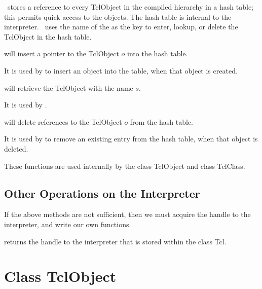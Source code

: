 \ns\ stores a reference to every TclObject in the compiled hierarchy
in a hash table;
this permits quick access to the objects.
The hash table is internal to the interpreter.
\ns\ uses the name of the  as the key
to enter, lookup, or delete the TclObject in the hash table.
\begin{list}{\textbullet}{}
\item {}
  will insert a pointer to the TclObject $o$ into the hash table.

  It is used by
  to insert an object into the table, when that object is created.

\item {}
  will retrieve the TclObject with the name $s$.

  It is used by
  .
\item {}
  will delete references to the TclObject $o$ from the hash table.

  It is used by
  to remove an existing entry from the hash table,
  when that object is deleted.
\end{list}
These functions are used internally by
the class TclObject and class TclClass.

\subsection{Other Operations on the Interpreter}
\label{sec:otcl:other}

If the above methods are not sufficient,
then we must acquire the handle to the interpreter,
and write our own functions.
\begin{list}{\textbullet}{}
\item {}
        returns the handle to the interpreter that is stored
        within the class Tcl.
\end{list}

\section{Class TclObject}
\label{sec:TclObject}

